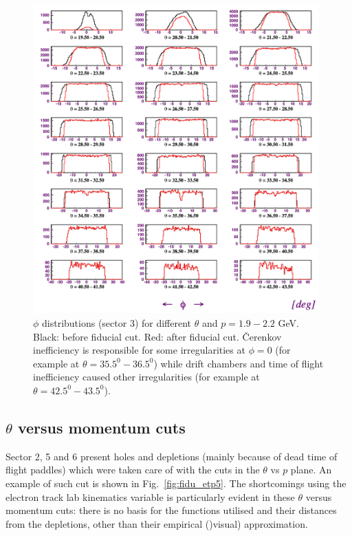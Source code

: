 \begin{figure}[ht]
    \centering
    \includegraphics[width=0.98\textwidth ]{img/electron_phis}
    \caption{$\phi$ distributions (sector 3) for different $\theta$ and
        $p=1.9-2.2$ GeV. Black: before fiducial cut. Red: after fiducial cut.
        \v Cerenkov inefficiency is responsible
        for some irregularities at $\phi = 0$ (for example at
        $\theta = 35.5^0 - 36.5^0$) while drift chambers and time of flight
        inefficiency caused other irregularities
        (for example at  $\theta = 42.5^0 - 43.5^0$).}
    \label{fig:fidu_ephis}
\end{figure}


\clearpage\newpage

\subsection{ $\theta$ versus momentum cuts}
Sector 2, 5 and 6 present holes and depletions (mainly because of dead time of flight paddles)
which were taken care of with the
cuts in the $\theta$ vs $p$ plane. An example of such cut is shown in Fig.~\ref{fig:fidu_etp5}.
The shortcomings using the electron track lab kinematics variable
is particularly evident in these  $\theta$ versus momentum cuts: there is no basis
for the functions utilised and their distances from the depletions, other than
their empirical ()visual) approximation.

